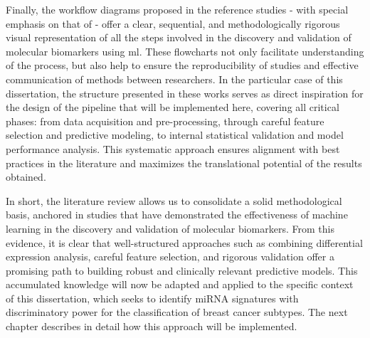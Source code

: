 Finally, the workflow diagrams proposed in the reference studies - with special
emphasis on that of \textcite{ml_gastric_Azari2023} - offer a clear,
sequential, and methodologically rigorous visual representation of all the
steps involved in the discovery and validation of molecular biomarkers using
\gls{ml}. These flowcharts not only facilitate understanding of the process,
but also help to ensure the reproducibility of studies and effective
communication of methods between researchers. In the particular case of this
dissertation, the structure presented in these works serves as direct
inspiration for the design of the pipeline that will be implemented here,
covering all critical phases: from data acquisition and pre-processing, through
careful feature selection and predictive modeling, to internal statistical
validation and model performance analysis. This systematic approach ensures
alignment with best practices in the literature and maximizes the translational
potential of the results obtained.

In short, the literature review allows us to consolidate a solid methodological
basis, anchored in studies that have demonstrated the effectiveness of machine
learning in the discovery and validation of molecular biomarkers. From this
evidence, it is clear that well-structured approaches such as combining
differential expression analysis, careful feature selection, and rigorous
validation offer a promising path to building robust and clinically relevant
predictive models. This accumulated knowledge will now be adapted and applied
to the specific context of this dissertation, which seeks to identify miRNA
signatures with discriminatory power for the classification of breast cancer
subtypes. The next chapter describes in detail how this approach will be
implemented.


